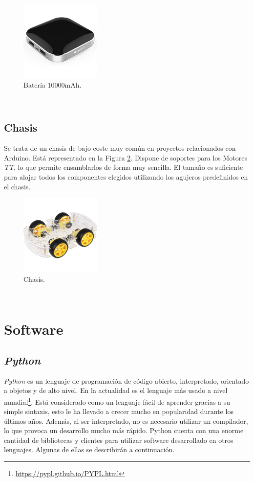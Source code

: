 \begin{figure} [h!]
	\begin{center}
		\includegraphics[width=4cm]{figs/battery}
	\end{center}
	\caption{Batería 10000mAh.}
	\label{fig:battery}
\end{figure}\

\subsection{Chasis}
\label{subsection:chasis}
Se trata de un chasis de bajo coste muy común en proyectos relacionados con Arduino. Está representado en la Figura \ref{fig:chasis}. Dispone de soportes para los Motores \textit{TT}, lo que permite ensamblarlos de forma muy sencilla. El tamaño es suficiente para alojar todos los componentes elegidos utilizando los agujeros predefinidos en el chasis.\\

\begin{figure} [h!]
	\begin{center}
		\includegraphics[width=4cm]{figs/chasis}
	\end{center}
	\caption{Chasis.}
	\label{fig:chasis}
\end{figure}\

\section{Software}

\subsection{\textit{Python}}
\label{subsection:python}
\textit{Python} es un lenguaje de programación de código abierto, interpretado, orientado a objetos y de alto nivel. En la actualidad es el lenguaje más usado a nivel mundial\footnote{\url{https://pypl.github.io/PYPL.html}}. Está considerado como un lenguaje fácil de aprender gracias a su simple sintaxis, esto le ha llevado a crecer mucho en popularidad durante los últimos años. Además, al ser interpretado, no es necesario utilizar un compilador, lo que provoca un desarrollo mucho más rápido. Python cuenta con una enorme cantidad de bibliotecas y clientes para utilizar software desarrollado en otros lenguajes. Algunas de ellas se describirán a continuación.\\

